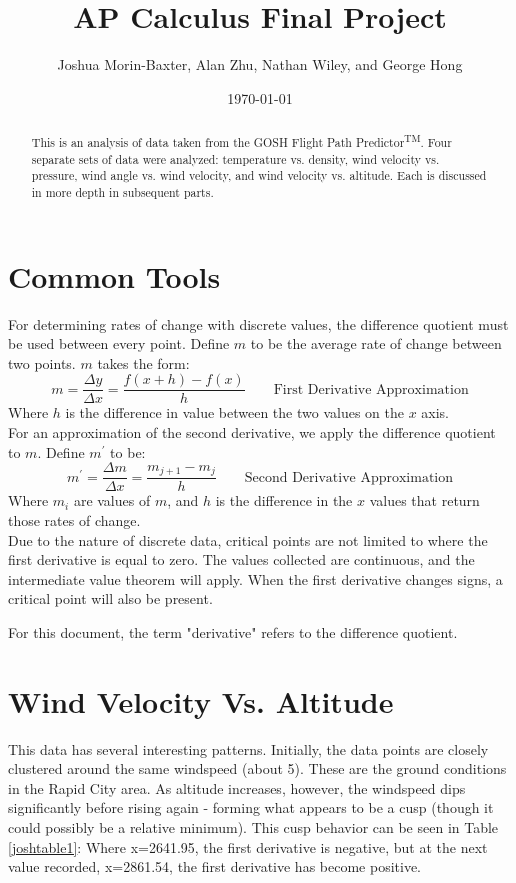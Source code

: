 \documentclass{article}
\begin{document}
\title{AP Calculus Final Project}
\author{Joshua Morin-Baxter, Alan Zhu, Nathan Wiley, and George Hong}
\date{\today}

\maketitle

\begin{abstract}
This is an analysis of data taken from the GOSH Flight Path Predictor\textsuperscript{TM}.  Four separate sets of data were analyzed: temperature vs. density, wind velocity vs. pressure, wind angle vs. wind velocity, and wind velocity vs. altitude. Each is discussed in more depth in subsequent parts.
\end{abstract}
\part{Common Tools}
For determining rates of change with discrete values, the difference quotient must be used between every point.  Define $m$ to be the average rate of change between two points.  $m$ takes the form:
$$m=\frac{\Delta y}{\Delta x}=\frac{f(x+h)-f(x)}{h}\qquad\text{First Derivative Approximation}$$
Where $h$ is the difference in value between the two values on the $x$ axis.
\\For an approximation of the second derivative, we apply the difference quotient to $m$.  Define $m^\prime$ to be:
$$m^\prime=\frac{\Delta m}{\Delta x}=\frac{m_{j+1}-m_j}{h}\qquad\text{Second Derivative Approximation}$$
Where $m_i$ are values of $m$, and $h$ is the difference in the $x$ values that return those rates of change.\\
Due to the nature of discrete data, critical points are not limited to where the first derivative is equal to zero.  The values collected are continuous, and the intermediate value theorem will apply.  When the first derivative changes signs, a critical point will also be present.
\begin{flushleft}
For this document, the term "derivative" refers to the difference quotient.
\end{flushleft}




\part{Wind Velocity Vs. Altitude}
This data has several interesting patterns.  Initially, the data points are closely clustered around the same windspeed (about 5\si{}).  These are the ground conditions in the Rapid City area.  As altitude increases, however, the windspeed dips significantly before rising again - forming what appears to be a cusp (though it could possibly be a relative minimum).  This cusp behavior can be seen in Table \ref{joshtable1}: Where x=2641.95, the first derivative is negative, but at the next value recorded, x=2861.54, the first derivative has become positive.
\end{document}
